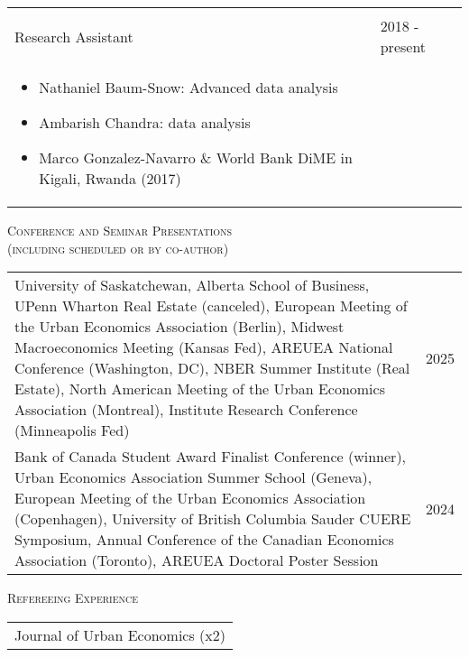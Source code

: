 \documentclass[11pt]{amsart}
\begin{document}
\begin{tabular}{ p{12.5cm} p{5cm}}
                   &             \\
Research Assistant & 2018 - present \\
\begin{itemize}
  \item Nathaniel Baum-Snow: Advanced data analysis 
  \item Ambarish Chandra: data analysis
  \item Marco Gonzalez-Navarro \& World Bank DiME in Kigali, Rwanda (2017)
\end{itemize}      &             


\end{tabular}





\normalsize

\vspace{0.4cm}
\LARGE
\textsc{Conference and Seminar Presentations \scriptsize \\ (including scheduled or by co-author)}
\vspace{0.2cm}
\normalsize

\begin{tabular}{ p{12.5cm} p{5cm}}
University of Saskatchewan, Alberta School of Business, UPenn Wharton Real Estate (canceled), European Meeting of the Urban Economics Association (Berlin), Midwest Macroeconomics Meeting (Kansas Fed), AREUEA National Conference (Washington, DC), NBER Summer Institute (Real Estate), North American Meeting of the Urban Economics Association (Montreal), Institute Research Conference (Minneapolis Fed)   & 2025 \\	
	
Bank of Canada Student Award Finalist Conference (winner), Urban Economics Association Summer School (Geneva), European Meeting of the Urban Economics Association (Copenhagen), University of British Columbia Sauder CUERE Symposium, Annual Conference of the Canadian Economics Association (Toronto),  AREUEA Doctoral Poster Session   & 2024  \\	

\end{tabular}


\vspace{0.4cm}

\LARGE
\textsc{Refereeing Experience}
\vspace{0.2cm}
\normalsize

\begin{tabular}{ p{17.5cm} }
Journal of Urban Economics (x2)  \\
\end{tabular}
 
\end{document}
